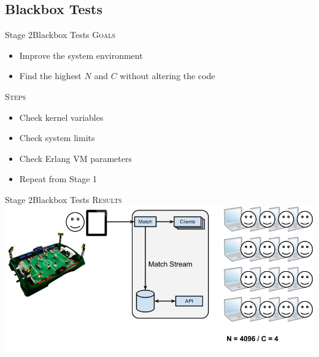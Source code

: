 \documentclass[utf8]{beamer}
\begin{document}
\subsection{Blackbox Tests}
\begin{frame}{Stage 2}{Blackbox Tests}
	\textsc{Goals}
	\begin{itemize}
		\item Improve the system environment
		\item Find the highest $N$ and $C$ without altering the code
	\end{itemize}
	\pause
	\textsc{Steps}
	\begin{itemize}
		\item Check kernel variables
		\item Check system limits
		\item Check Erlang VM parameters
		\item Repeat \alert{from Stage 1}
	\end{itemize}
\end{frame}
\begin{frame}{Stage 2}{Blackbox Tests}
	\textsc{Results}
	\includegraphics[top=-1,width=\textwidth]{img/MatchStream-2.png}
\end{frame}
\end{document}
